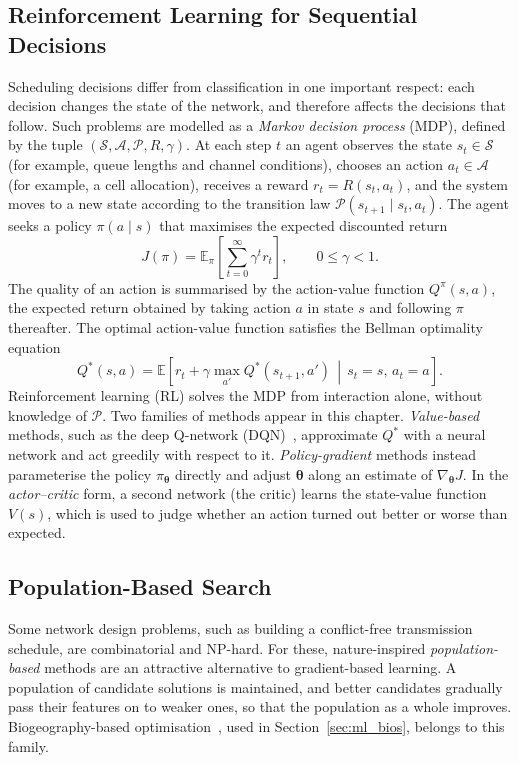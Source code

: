 \subsection{Reinforcement Learning for Sequential Decisions}
Scheduling decisions differ from classification in one important respect: each decision changes the state of the network, and therefore affects the decisions that follow. Such problems are modelled as a \emph{Markov decision process} (MDP), defined by the tuple $(\mathcal{S},\mathcal{A},\mathcal{P},R,\gamma)$. At each step $t$ an agent observes the state $s_t\in\mathcal{S}$ (for example, queue lengths and channel conditions), chooses an action $a_t\in\mathcal{A}$ (for example, a cell allocation), receives a reward $r_t=R(s_t,a_t)$, and the system moves to a new state according to the transition law $\mathcal{P}(s_{t+1}\mid s_t,a_t)$. The agent seeks a policy $\pi(a\mid s)$ that maximises the expected discounted return
\begin{equation}
  J(\pi)=\mathbb{E}_{\pi}\!\left[\sum_{t=0}^{\infty}\gamma^{t}r_t\right], \qquad 0\le\gamma<1.
  \label{eq:ml_return}
\end{equation}
The quality of an action is summarised by the action-value function $Q^{\pi}(s,a)$, the expected return obtained by taking action $a$ in state $s$ and following $\pi$ thereafter. The optimal action-value function satisfies the Bellman optimality equation~\cite{ml_sutton2018}
\begin{equation}
  Q^{*}(s,a)=\mathbb{E}\!\left[r_t+\gamma\max_{a'}Q^{*}(s_{t+1},a')\,\middle|\,s_t=s,\,a_t=a\right].
  \label{eq:ml_bellman}
\end{equation}
Reinforcement learning (RL) solves the MDP from interaction alone, without knowledge of $\mathcal{P}$. Two families of methods appear in this chapter. \emph{Value-based} methods, such as the deep Q-network (DQN)~\cite{ml_mnih2015}, approximate $Q^{*}$ with a neural network and act greedily with respect to it. \emph{Policy-gradient} methods instead parameterise the policy $\pi_{\boldsymbol{\theta}}$ directly and adjust $\boldsymbol{\theta}$ along an estimate of $\nabla_{\boldsymbol{\theta}}J$. In the \emph{actor--critic} form, a second network (the critic) learns the state-value function $V(s)$, which is used to judge whether an action turned out better or worse than expected.

\subsection{Population-Based Search}
Some network design problems, such as building a conflict-free transmission schedule, are combinatorial and NP-hard. For these, nature-inspired \emph{population-based} methods are an attractive alternative to gradient-based learning. A population of candidate solutions is maintained, and better candidates gradually pass their features on to weaker ones, so that the population as a whole improves. Biogeography-based optimisation~\cite{ml_simon2008bbo}, used in Section~\ref{sec:ml_bios}, belongs to this family.

